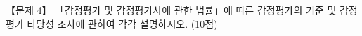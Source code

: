 \begin{longquestion}{【문제 4】}
「감정평가 및 감정평가사에 관한 법률」에 따른 감정평가의 기준 및 감정평가 타당성 조사에 관하여 각각 설명하시오. (10점) \par
\end{longquestion}

